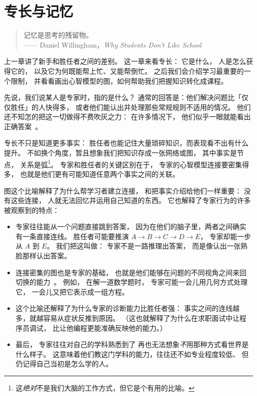 \chapter{专长与记忆}\label{s:memory}

\begin{quote}

  记忆是思考的残留物。\\
  —— Daniel Willingham，\emph{Why Students Don't Like School}

\end{quote}

上一章讲了新手和胜任者之间的差别。
这一章来看专长：
它是什么，
人是怎么获得它的，
以及它为何既能帮上忙、又能帮倒忙。
之后我们会介绍学习最重要的一个限制，
并看看画出心智模型的图，如何帮助我们把握知识转化成课程。

先说，我们说某人是专家时，指的是什么？
通常的回答是：他们解决问题比「仅仅胜任」的人快得多，
或者他们能认出并处理那些常规规则不适用的情况。
他们还不知怎的把这一切做得不费吹灰之力：
在许多情况下，
他们似乎一眼就能看出正确答案~\cite{Parn2017}。

专长不只是知道更多事实：
胜任者也能记住大量琐碎知识，而表现看不出有什么提升。
不如换个角度，暂且想象我们把知识存成一张网络或图，
其中事实是节点，
关系是弧\footnote{这\emph{绝对}不是我们大脑的工作方式，但它是个有用的比喻。}。
专家和胜任者的关键区别在于，
专家的心智模型连接要密集得多，
也就是他们更有可能知道任意两个事实之间的关联。

图这个比喻解释了为什么帮学习者建立连接，
和把事实介绍给他们一样重要：
没有这些连接，
人就无法回忆并运用自己知道的东西。
它也解释了专家行为的许多被观察到的特点：

\begin{itemize}

\item
  专家往往能从一个问题直接跳到答案，
  因为在他们的脑子里，两者之间确实有一条直接连线。
  胜任者可能要推演
  $A{\rightarrow}B{\rightarrow}C{\rightarrow}D{\rightarrow}E$，
  专家却能一步从 $A$ 到 $E$。
  我们把这叫做：
  专家不是一路推理出答案，
  而是像认出一张熟脸那样认出答案。

\item
  连接密集的图也是专家的基础，
  也就是他们能够在问题的不同视角之间来回切换的能力~\cite{Petr2016}。
  例如，
  在解一道数学题时，
  专家可能一会儿用几何方式处理它，
  一会儿又把它表示成一组方程。

\item
  这个比喻还解释了为什么专家的诊断能力比胜任者强：
  事实之间的连线越多，就越容易从症状反推到原因。
  （这也就解释了为什么在求职面试中让程序员调试，
  比让他编程更能准确反映他的能力。）

\item
  最后，
  专家往往对自己的学科熟悉到了
  再也无法想象\emph{不}用那种方式看世界是什么样子。
  这意味着他们教这门学科的能力，往往还不如专业程度较低、
  但仍记得自己当初是怎么学的人。

\end{itemize}

